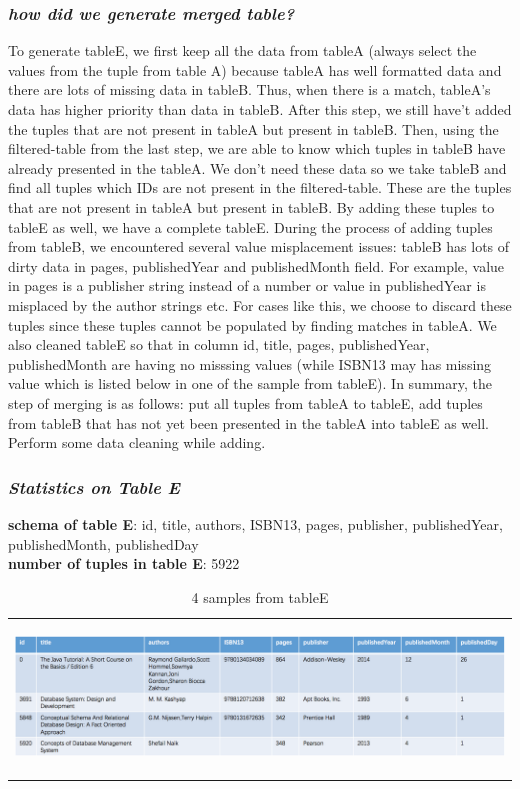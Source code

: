 \documentclass[10pt, oneside]{article}
\begin{document}
\subsubsection*{\textit{how did we generate merged table?}}
To generate tableE, we first keep all the data from tableA (always select the values from the tuple from table A) because tableA has well formatted data and there are lots of missing data in tableB. Thus, when there is a match, tableA's data has higher priority than data in tableB. After this step, we still have't added the tuples that are not present in tableA but present in tableB. Then, using the filtered-table from the last step, we are able to know which tuples in tableB have already presented in the tableA. We don't need these data so we take tableB and find all tuples which IDs are not  present in the filtered-table. These are the tuples that are not present in tableA but present in tableB. By adding these tuples to tableE as well, we have a complete tableE. During the process of adding tuples from tableB, we encountered several value misplacement issues: tableB has lots of dirty data in pages, publishedYear and publishedMonth field. For example,  value in pages is a publisher string instead of a number or value in publishedYear is misplaced by the author strings etc. For cases like this, we choose to discard these tuples since these tuples cannot be populated by finding matches in tableA. We also cleaned tableE so that in column id, title, pages, publishedYear, publishedMonth are having no misssing values (while ISBN13 may has missing value which is listed below in one of the sample from tableE). In summary, the step of merging is as follows: put all tuples from tableA to tableE, add tuples from tableB that has not yet been presented in the tableA into tableE as well. Perform some data cleaning while adding.

\subsubsection*{\textit{Statistics on Table E}}
\textbf{schema of table E}:   id, title,	authors, ISBN13,	pages,	publisher,	publishedYear,  publishedMonth, publishedDay\\
\textbf{number of tuples in table E}: 5922\\
\begin{table}[H]
\begin{tabular}{c}
\includegraphics[width=16cm, height=4cm]{samples}
\end{tabular}
\caption{4 samples from tableE}
\end{table}
\end{document}
